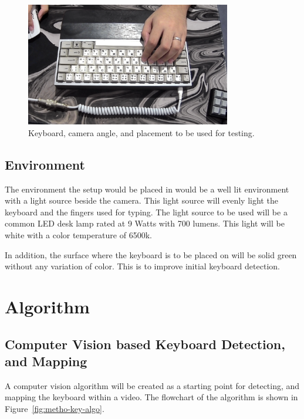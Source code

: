 \documentclass{report}
\begin{document}
\begin{figure}[H]
	\centering
	\includegraphics[width=0.8\textwidth]{actual-keeb.png}
	\caption{Keyboard, camera angle, and placement to be used for testing.}
	\label{fig:metho-keeb}
	\centering
\end{figure}


\subsection{Environment}
The environment the setup would be placed in would be a well lit environment
with a light source beside the camera. This light source will evenly light the
keyboard and the fingers used for typing. The light source to be used will be a
common LED desk lamp rated at 9 Watts with 700 lumens. This light will be white
with a color temperature of 6500k.

In addition, the surface where the keyboard is to be placed on will be solid
green without any variation of color. This is to improve initial keyboard
detection.

\section{Algorithm}
\label{section:metho-algo}

\subsection{Computer Vision based Keyboard Detection, and Mapping}
\label{section:metho-algo-keyboard}

A computer vision algorithm will be created as a starting point for detecting,
and mapping the keyboard within a video. The flowchart of the algorithm is shown
in Figure~\ref{fig:metho-key-algo}.
\end{document}
